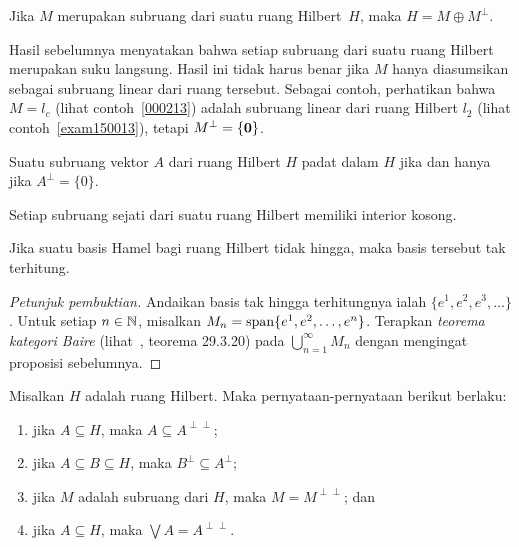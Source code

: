 \begin{cor} Jika $M$ merupakan subruang dari suatu ruang Hilbert~$H$, maka $H = M \oplus M^\perp$.
\end{cor}

\begin{exam} Hasil sebelumnya menyatakan bahwa setiap subruang dari suatu ruang Hilbert merupakan suku
langsung. Hasil ini tidak harus benar jika $M$ hanya diasumsikan sebagai subruang linear dari ruang tersebut.
Sebagai contoh, perhatikan bahwa $M = l_c$ (lihat contoh~\ref{000213}) adalah subruang linear dari
ruang Hilbert $l_2$ (lihat contoh~\ref{exam150013}), tetapi $M^\perp = \{\mathbf{0}\}$.
\end{exam}

\begin{cor} Suatu subruang vektor $A$ dari ruang Hilbert $H$ padat dalam $H$ jika dan hanya jika $A^\perp = \{0\}$.
\end{cor}

\begin{prop} Setiap subruang sejati dari suatu ruang Hilbert memiliki interior kosong.
\end{prop}

\begin{prop} Jika suatu basis Hamel bagi ruang Hilbert tidak hingga, maka basis tersebut tak terhitung.
\end{prop}

\begin{proof}[\emph{Petunjuk pembuktian}] Andaikan basis tak hingga terhitungnya ialah $\{e^1, e^2, e^3, \dots \}$.
Untuk setiap $n \in \mathbb{N}$, misalkan $M_n = \operatorname{span}\{e^1, e^2, \dots, e^n\}$.  Terapkan \emph{teorema kategori Baire} (lihat~\cite{Erdman:2007},
teorema 29.3.20) pada $\bigcup_{n=1}^\infty M_n$ dengan mengingat proposisi sebelumnya.   \ns
\end{proof}

\begin{prop}\label{00023} Misalkan $H$ adalah ruang Hilbert. Maka pernyataan-pernyataan berikut berlaku:
 \begin{enumerate}
  \item jika $A \subseteq H$, maka $A \subseteq A^{\perp\perp}$;
  \item jika $A \subseteq B \subseteq H$, maka $B^\perp \subseteq A^\perp$;
  \item jika $M$ adalah subruang dari $H$, maka $M = M^{\perp\perp}$; dan
  \item jika $A \subseteq H$, maka $\bigvee A = A^{\perp\perp}$.
 \end{enumerate}
\end{prop}

